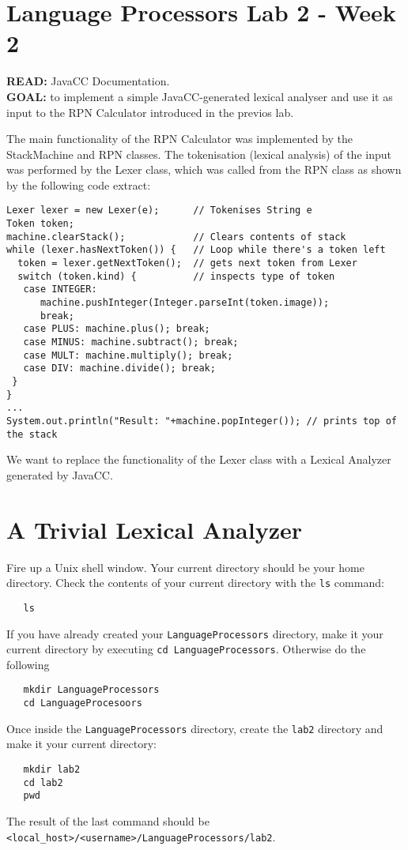 \documentclass{article}
\begin{document}
\thispagestyle{empty}

\newcommand{\negra}[1]{\textbf{#1}}

\section*{Language Processors Lab 2 - Week 2}

\textbf{READ: } JavaCC Documentation.\\

\textbf{GOAL:} to implement a simple JavaCC-generated lexical analyser and use it as input to the RPN Calculator introduced in the previos lab.

The main functionality of the RPN Calculator was implemented by the StackMachine and RPN classes. The tokenisation (lexical analysis) of the input was performed by the Lexer class, which was called from the RPN class as shown by the following code extract:

\begin{verbatim}
Lexer lexer = new Lexer(e);      // Tokenises String e
Token token;
machine.clearStack();            // Clears contents of stack 
while (lexer.hasNextToken()) {   // Loop while there's a token left
  token = lexer.getNextToken();  // gets next token from Lexer
  switch (token.kind) {          // inspects type of token
   case INTEGER: 
      machine.pushInteger(Integer.parseInt(token.image));
      break;
   case PLUS: machine.plus(); break;
   case MINUS: machine.subtract(); break;
   case MULT: machine.multiply(); break;
   case DIV: machine.divide(); break;
 }
}
...
System.out.println("Result: "+machine.popInteger()); // prints top of the stack
\end{verbatim}

We want to replace the functionality of the Lexer class with a Lexical Analyzer generated by JavaCC.

\section*{A Trivial Lexical Analyzer}

Fire up a Unix shell window.  Your current directory should be  your home directory. Check the contents of  your current directory with the \verb+ls+ command:
\begin{verbatim}
   ls
\end{verbatim}
If you have already created your \verb+LanguageProcessors+ directory, make it your current directory by executing \verb+cd LanguageProcessors+. Otherwise do the following
\begin{verbatim}
   mkdir LanguageProcessors
   cd LanguageProcesoors
\end{verbatim}
Once inside the \verb+LanguageProcessors+ directory, create the \verb+lab2+ directory and make it your current directory:
\begin{verbatim}
   mkdir lab2
   cd lab2
   pwd
\end{verbatim}
The result of the last command should be \verb+<local_host>/<username>/LanguageProcessors/lab2+.
\end{document}
